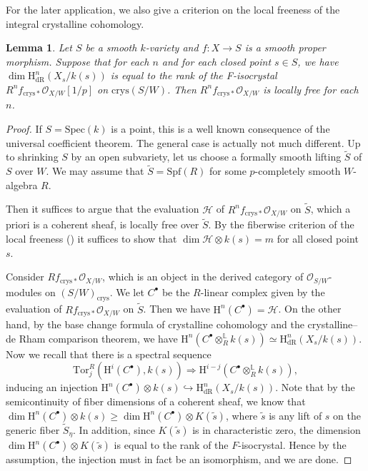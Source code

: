 \documentclass[11pt, letterpaper]{amsart}
\theoremstyle{plain}
\newtheorem{lemma}[theorem]{Lemma}
\theoremstyle{definition}
\newcommand{\IL}{\mathbb{L}}
\newcommand{\Spec}{\mathrm{Spec}}
\newcommand\tensor{{\otimes}}
\newcommand{\<}{\langle}
\renewcommand{\>}{\rangle}
\newcommand{\into}{\hookrightarrow}
\def\wt{\widetilde}
\newcommand{\sH}{\mathcal{H}}
\newcommand{\sO}{\mathcal{O}}
\renewcommand{\H}{\mathrm{H}}
\newcommand{\crys}{\mathrm{crys}}
\newcommand{\dR}{\mathrm{dR}}
\begin{document}
For the later application, we also give a criterion on the local freeness of the integral crystalline cohomology.
\begin{lemma}
	\label{lem:local_free_of_crys_coh}
	Let $S$ be a smooth $k$-variety and $f : X \to S$ is a smooth proper morphism. 
	Suppose that for each $n$ and for each closed point $s \in S$, we have $\dim \H^n_\dR(X_s/k(s))$ is equal to the rank of the F-isocrystal $R^n f_{\crys *} \sO_{X/W}[1/p]$ on $\crys(S/W)$. 
	Then $R^n f_{\crys*} \sO_{X/W}$ is locally free for each $n$. 
\end{lemma}
\begin{proof}
	If $S = \Spec(k)$ is a point, this is a well known consequence of the universal coefficient theorem. The general case is actually not much different. 
	Up to shrinking $S$ by an open subvariety, let us choose a formally smooth lifting $\wt{S}$ of $S$ over $W$. 
	We may assume that $\wt{S} = \mathrm{Spf}(R)$ for some $p$-completely smooth $W$-algebra $R$. 
	
	Then it suffices to argue that the evaluation $\sH$ of $R^n f_{\crys*} \sO_{X/W}$ on $\wt{S}$, which a priori is a coherent sheaf, is locally free over $\wt{S}$. 
	By the fiberwise criterion of the local freeness (\cite[\href{https://stacks.math.columbia.edu/tag/0FWG}{Tag 0FWG}]{stacks-project}) it suffices to show that $\dim \sH \tensor k(s) = m$ for all closed point $s$. 
	
	Consider $R f_{\crys *} \sO_{X/W}$, which is an object in the derived category of $\sO_{S/W}$-modules on $(S/W)_\crys$. 
	We let $C^\bullet$ be the $R$-linear complex given by the evaluation of $R f_{\crys *} \sO_{X/W}$ on $\wt{S}$.
	Then we have $\H^n(C^\bullet) = \sH$. 
	On the other hand, by the base change formula of crystalline cohomology \cite[Cor.~7.12]{BOBook} and the crystalline--de Rham comparison theorem, we have $\H^n(C^\bullet \tensor_{R}^\IL k(s)) \simeq \H^n_\dR(X_s/k(s))$. 
	Now we recall that there is a spectral sequence \cite[\href{https://stacks.math.columbia.edu/tag/061Y}{Tag 061Y}]{stacks-project}
	$$ \mathrm{Tor}^R_{j} (\H^i(C^\bullet), k(s)) \Rightarrow \H^{i - j}(C^\bullet \tensor^\IL_R k(s)),$$
	inducing an injection $\H^n(C^\bullet) \tensor k(s) \into \H^n_\dR(X_s/k(s))$. 
	Note that by the semicontinuity of fiber dimensions of a coherent sheaf, we know that $\dim \H^n(C^\bullet) \tensor k(s) \ge \dim \H^n(C^\bullet) \tensor K(\wt{s})$, where $\wt{s}$ is any lift of $s$ on the generic fiber $\wt{S}_\eta$. 
	In addition, since $K(\wt{s})$ is in characteristic zero, the dimension $\dim \H^n(C^\bullet) \tensor K(\wt{s})$ is equal to the rank of the $F$-isocrystal.
	Hence by the assumption, the injection must in fact be an isomorphism, and we are done. 
\end{proof}
\end{document}
